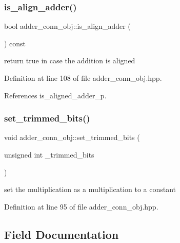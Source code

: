 \subsubsection{\texorpdfstring{is\+\_\+align\+\_\+adder()}{is\_align\_adder()}}
{\footnotesize\ttfamily bool adder\+\_\+conn\+\_\+obj\+::is\+\_\+align\+\_\+adder (\begin{DoxyParamCaption}{ }\end{DoxyParamCaption}) const\hspace{0.3cm}{\ttfamily [inline]}}



return true in case the addition is aligned 



Definition at line 108 of file adder\+\_\+conn\+\_\+obj.\+hpp.



References is\+\_\+aligned\+\_\+adder\+\_\+p.

\mbox{\label{classadder__conn__obj_a669d524d921f779ad0ada744dddc94b1}} 
\subsubsection{\texorpdfstring{set\+\_\+trimmed\+\_\+bits()}{set\_trimmed\_bits()}}
{\footnotesize\ttfamily void adder\+\_\+conn\+\_\+obj\+::set\+\_\+trimmed\+\_\+bits (\begin{DoxyParamCaption}\item[{unsigned int}]{\+\_\+trimmed\+\_\+bits }\end{DoxyParamCaption})\hspace{0.3cm}{\ttfamily [inline]}}



set the multiplication as a multiplication to a constant 



Definition at line 95 of file adder\+\_\+conn\+\_\+obj.\+hpp.



\subsection{Field Documentation}
\mbox{\label{classadder__conn__obj_a5a0c72d0853ca2054d64ab898ef532ea}} 
